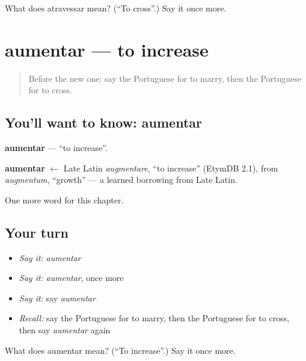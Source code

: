 \begin{tcolorbox}[breakable,colback=teal!4,colframe=teal!35!black,title={Before you move on}]
What does atravessar mean? (\textquotedblleft{}To cross\textquotedblright{}.) Say it once more.
\end{tcolorbox}
\section[aumentar]{aumentar — to increase}

\label{lesson:PT-C174-aumentar}



\begin{quote}
Before the new one: say the Portuguese for to marry, then the Portuguese for to cross.
\end{quote}

\subsection*{You'll want to know: aumentar}
\textbf{aumentar} — \textquotedblleft{}to increase\textquotedblright{}.

\begin{cousinweb}
\textbf{aumentar} $\leftarrow$ Late Latin \emph{augmentare}, \textquotedblleft{}to increase\textquotedblright{} (EtymDB 2.1), from \emph{augmentum}, \textquotedblleft{}growth\textquotedblright{} — a learned borrowing from Late Latin.
\end{cousinweb}

\begin{grammarlens}[title={What you've built}]
One more word for this chapter.
\end{grammarlens}

\subsection*{Your turn}
\begin{itemize}
\raggedright
  \item \emph{Say it:} \emph{aumentar}
  \item \emph{Say it:} \emph{aumentar}, once more
  \item \emph{Say it:} say \emph{aumentar}
  \item \emph{Recall:} say the Portuguese for to marry, then the Portuguese for to cross, then say \emph{aumentar} again
\end{itemize}

\begin{tcolorbox}[breakable,colback=teal!4,colframe=teal!35!black,title={Before you move on}]
What does aumentar mean? (\textquotedblleft{}To increase\textquotedblright{}.) Say it once more.
\end{tcolorbox}

